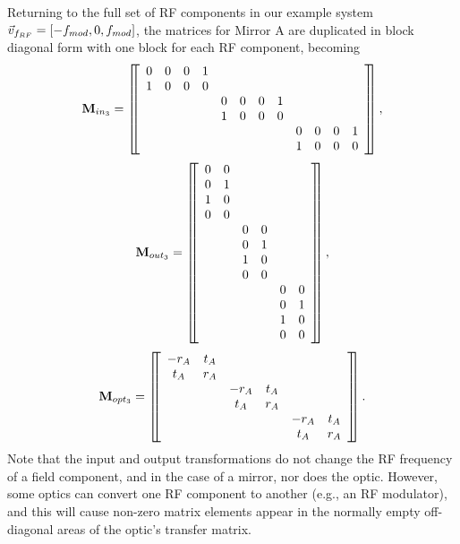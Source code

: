 \documentclass[12pt]{article}
\begin{document}
Returning to the full set of RF components in our example system $\vFrf = \grp{-f_{mod},0,f_{mod}}$, the matrices for Mirror A are duplicated in block diagonal form with one block for each RF component, becoming
\begin{equation*}
\mInn{3} =
\matrixBegin{cccccccccccc}
 0 & 0 & 0 & 1 & & & & & & & & \\
 1 & 0 & 0 & 0 & & & & & & & & \\
 & & & & 0 & 0 & 0 & 1 & & & & \\
 & & & & 1 & 0 & 0 & 0 & & & & \\
 & & & & & & & & 0 & 0 & 0 & 1 \\
 & & & & & & & & 1 & 0 & 0 & 0 \\
\matrixEnd,
\end{equation*}
\begin{equation*}
\mOutn{3} =
\matrixBegin{cccccc}
 0 & 0 & & & & \\
 0 & 1 & & & & \\
 1 & 0 & & & & \\
 0 & 0 & & & & \\
 & & 0 & 0 & & \\
 & & 0 & 1 & & \\
 & & 1 & 0 & & \\
 & & 0 & 0 & & \\
 & & & & 0 & 0 \\
 & & & & 0 & 1 \\
 & & & & 1 & 0 \\
 & & & & 0 & 0 \\
\matrixEnd,
\end{equation*}
\begin{equation*}
\mOptn{3} =
\matrixBegin{cccccc}
 -r_A & t_A & & & & \\
 t_A & r_A & & & & \\
 & & -r_A & t_A & & \\
 & & t_A & r_A & & \\
 & & & & -r_A & t_A \\
 & & & & t_A & r_A \\
\matrixEnd.
\end{equation*}
Note that the input and output transformations do not change the RF frequency of a field component, and in the case of a mirror, nor does the optic.
However, some optics can convert one RF component to another (e.g., an RF modulator), and this will cause non-zero matrix elements appear in the normally empty off-diagonal areas of the optic's transfer matrix.
\end{document}
